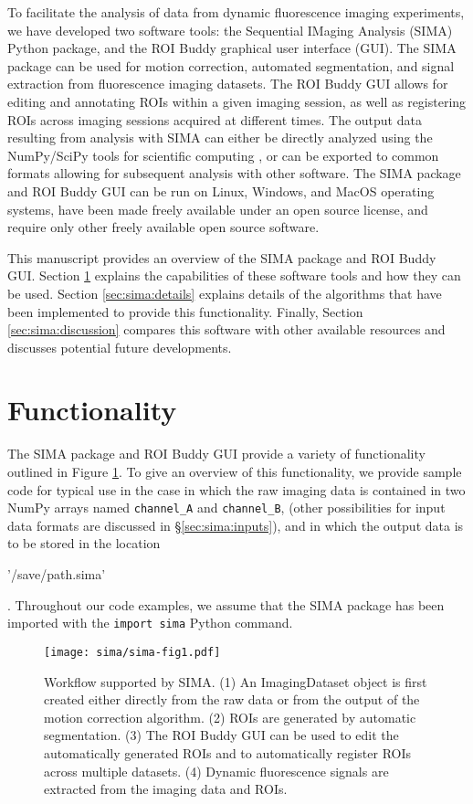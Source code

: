 To facilitate the analysis of data from dynamic fluorescence imaging experiments,
we have developed two software tools:
the Sequential IMaging Analysis (SIMA) Python package,
and the ROI Buddy graphical user interface (GUI). 
The SIMA package can be used for motion correction, automated segmentation,
and signal extraction from fluorescence imaging datasets.
The ROI Buddy GUI allows for editing and annotating ROIs
within a given imaging session, as well as registering ROIs across imaging sessions acquired at different times.
The output data resulting from analysis with SIMA can either be directly
analyzed using the NumPy/SciPy tools for scientific computing 
\citep{Oliphant2007,Jones2001}, or can be exported to common formats
allowing for subsequent analysis with other software.
The SIMA package and ROI Buddy GUI can be run on Linux, Windows, and MacOS
operating systems, have been made freely available under an open source
license, and require only other freely available open source software.

This manuscript provides an overview of the SIMA package and ROI Buddy GUI.
Section \ref{sec:sima:functionality} explains the capabilities of these software
tools and how they can be used.
Section \ref{sec:sima:details} explains details of the algorithms that have
been implemented to provide this functionality.
Finally, 
Section \ref{sec:sima:discussion} compares this software with other
available resources and discusses potential future developments.


\section{Functionality}\label{sec:sima:functionality}
The SIMA package and ROI Buddy GUI provide a variety of functionality outlined in Figure \ref{fig:sima:workflow}.
To give an overview of this functionality, we provide sample code for typical use
in the case in which the raw imaging data is contained in two NumPy arrays
named \verb|channel_A| and \verb|channel_B|,
(other possibilities for input data formats are discussed in \S\ref{sec:sima:inputs}),
and in which the output data is to be stored in the location 
\begin{verb}'/save/path.sima'\end{verb}.
Throughout our code examples, we assume that the SIMA package has been imported
with the \verb|import sima| Python command.

\begin{figure}[ht]
\centering
\texttt{[image: sima/sima-fig1.pdf]}
\caption[Workflow supported by SIMA]{
 Workflow supported by SIMA. 
 (1) An ImagingDataset object is first created either directly from the raw data
 or from the output of the motion correction algorithm.
 (2) ROIs are generated by automatic segmentation.
 (3) The ROI Buddy GUI can be used to edit the automatically generated ROIs and to
 automatically register ROIs across multiple datasets.
 (4) Dynamic fluorescence signals are extracted from the imaging data and ROIs.}
 \label{fig:sima:workflow}
\end{figure}

